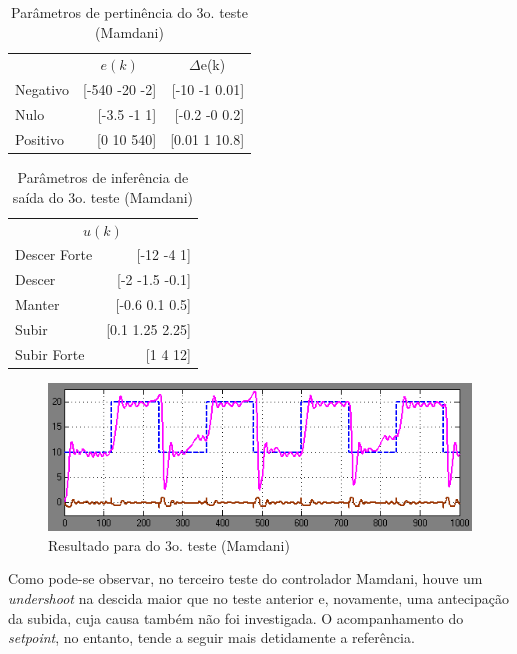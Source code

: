 \documentclass[
	twoside,				%
	twocolumn,				%
	english,				%
	brazil,					%
]{article}
\begin{document}
\begin{table}[!h]
\caption{Parâmetros de pertinência do 3o. teste \\ (Mamdani)}
\centering
\begin{tabular}{lrr}
\toprule
& \multicolumn{1}{c}{$e(k)$} & \multicolumn{1}{c}{$\Delta$e(k)} \\
\cmidrule(r){1-3} 
Negativo & [-540 -20 -2] & [-10 -1 0.01] \\
Nulo & [-3.5 -1 1] & [-0.2 -0 0.2] \\
Positivo & [0 10 540] & [0.01 1 10.8] \\
\bottomrule
\end{tabular}
\end{table}

\begin{table}[!h]
\caption{Parâmetros de inferência de saída do 3o. teste (Mamdani)}
\centering
\begin{tabular}{lr}
\toprule
\multicolumn{2}{c}{$u(k)$} \\
\cmidrule(r){1-2}
Descer Forte & [-12 -4 1] \\
Descer & [-2 -1.5 -0.1] \\
Manter & [-0.6 0.1 0.5] \\
Subir & [0.1 1.25 2.25] \\
Subir Forte & [1 4 12] \\
\bottomrule
\end{tabular}
\end{table}

\begin{figure}[!h]
    \centering
    \includegraphics[width=\columnwidth]{mamdani3.png}
    \caption { Resultado para do 3o. teste (Mamdani)}
\end{figure}

Como pode-se observar, no terceiro teste do controlador Mamdani, houve um \textit{undershoot} na descida maior que no teste anterior e, novamente, uma antecipação da subida, cuja causa também não foi investigada. O acompanhamento do \textit{setpoint}, no entanto, tende a seguir mais detidamente a referência.
\end{document}
